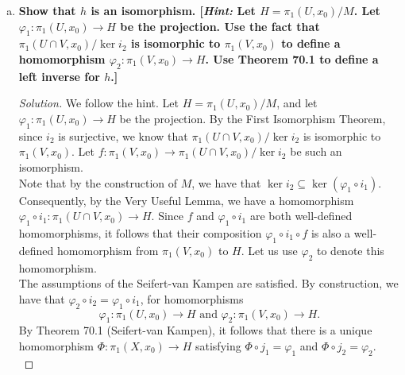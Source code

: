 \documentclass[11pt]{article}
\newenvironment{solution}
  {\renewcommand\qedsymbol{$\blacksquare$}\begin{proof}[Solution]}
  {\end{proof}}
\begin{document}
\begin{enumerate}[a)]
\begin{solution}
    Since $M$ is by definition the least normal subgroup of $\pi_1(u, x_0)$ containing $i_1(\ker i_2)$, we can conclude that $M$ is a normal subgroup of $\ker j_1$. 
    By the Very Useful Lemma\footnote{Let $\psi \colon G \rightarrow G^{\prime}$ be a group homomorphism. Suppose $N$ is a normal subgroup of $G$, and that $N \subseteq \ker(\psi)$. 
    Then there exists a group homomorphism $\overline{\psi} \colon G/N \rightarrow G^{\prime}$ given by $\overline{\psi}(gN) = \psi(g)$.},
    $j_1$ induces a homomorphism 
    \[ 
        h\colon \pi_1(U, x_0) / M \rightarrow \pi_1(X, x_0).
    \] 
    Since $j_1$ is surjective, so is $h$; this gives us the epimorphism $h\colon \pi_1(U, x_0) / M \rightarrow \pi_1(X, x_0)$, as desired.
    \end{solution}

    \item \textbf{Show that $h$ is an isomorphism. [\textit{Hint:} Let $H = \pi_1(U, x_0)/M$. Let $\varphi_1\colon \pi_1(U, x_0) \rightarrow  H$ be the projection.
    Use the fact that $\pi_1(U \cap V, x_0)/\ker i_2$ is isomorphic to $\pi_1(V, x_0)$ to define a homomorphism $\varphi_2\colon \pi_1(V, x_0) \rightarrow H$. 
    Use Theorem 70.1 to define a left inverse for $h$.]}

    \begin{solution}
    We follow the hint. Let $H = \pi_1(U, x_0)/M$, and let $\varphi_1\colon \pi_1(U, x_0) \rightarrow  H$ be the projection.
    By the First Isomorphism Theorem, since $i_2$ is surjective, we know that $\pi_1(U \cap V, x_0) / \ker i_2$ is isomorphic to $\pi_1(V, x_0)$. 
    Let $f\colon \pi_1(V, x_0) \rightarrow \pi_1(U \cap V, x_0) / \ker i_2$ be such an isomorphism. \\

    Note that by the construction of $M$, we have that $\ker i_2 \subseteq \ker (\varphi_1 \circ i_1)$. Consequently, by the Very Useful Lemma, we have a homomorphism 
    $\varphi_1 \circ i_1 \colon \pi_1(U \cap V, x_0) \rightarrow H$. Since $f$ and $\varphi_1 \circ i_1$ are both well-defined homomorphisms, 
    it follows that their composition $\varphi_1 \circ i_1 \circ f$ is also a well-defined homomorphism from $\pi_1(V, x_0)$ to $H$. 
    Let us use $\varphi_2$ to denote this homomorphism. \\

    The assumptions of the Seifert-van Kampen are satisfied. By construction, we have that $\varphi_2 \circ i_2 = \varphi_1 \circ i_1$, for homomorphisms
    \[
        \varphi_1\colon \pi_1(U, x_0) \rightarrow H \text{ and } \varphi_2\colon \pi_1(V, x_0) \rightarrow H.
    \]
    By Theorem 70.1 (Seifert-van Kampen), it follows that there is a unique homomorphism $\Phi \colon \pi_1(X, x_0) \rightarrow H$ satisfying $\Phi \circ j_1 = \varphi_1$ and $\Phi \circ j_2 = \varphi_2$. \\
    

\end{solution}
\end{enumerate}
\end{document}
